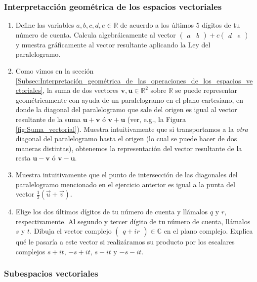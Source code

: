 \documentclass[apuntes]{subfiles}
\begin{document}
\subsubsection{Interpretacción geométrica de los espacios vectoriales}

\begin{enumerate}
        \item Define las variables $a,b,c,d,e\in\mathbb{R}$ de acuerdo a los últimos 5 dígitos de tu número de cuenta. Calcula algebráicamente al vector $\begin{pmatrix}a & b\end{pmatrix}+c\begin{pmatrix}d & e\end{pmatrix}$ y muestra gráficamente al vector resultante aplicando la Ley del paralelogramo. 
                \item Como vimos en la sección \ref{Subsec:Interpretación_geométrica_de_las_operaciones_de_los_espacios_vectoriales}, la suma de dos vectores $\mathbf{v},\mathbf{u}\in\mathbb{R}^2$ sobre $\mathbb{R}$ se puede representar geométricamente con ayuda de un paralelogramo en el plano cartesiano, en donde la diagonal del paralelogramo que sale del origen es igual al vector resultante de la suma $\mathbf{u}+\mathbf{v}$ ó $\mathbf{v}+\mathbf{u}$ (ver, e.g., la Figura \ref{fig:Suma_vectorial}). Muestra intuitivamente que si transportamos a la \emph{otra} diagonal del paralelogramo hasta el origen (lo cual se puede hacer de dos maneras distintas), obtenemos la representación del vector resultante de la resta $\mathbf{u}-\mathbf{v}$ ó $\mathbf{v}-\mathbf{u}$. 
                        \item Muestra intuitivamente que el punto de intersección de las diagonales del paralelogramo mencionado en el ejercicio anterior es igual a la punta del vector $\frac{1}{2}(\vec{u}+\vec{v})$. 
                                \item Elige los dos últimos dígitos de tu número de cuenta y llámalos $q$ y $r$, respectivamente. Al segundo y tercer dígito de tu número de cuenta, llámalos $s$ y $t$. Dibuja el vector complejo $\begin{pmatrix} q + ir \end{pmatrix}\in\mathbb{C}$ en el plano complejo. Explica qué le pasaría a este vector si realizáramos su producto por los escalares complejos $s+it$, $-s+it$, $s-it$ y $-s-it$. 
\end{enumerate}

\subsubsection{Subespacios vectoriales}
\end{document}
